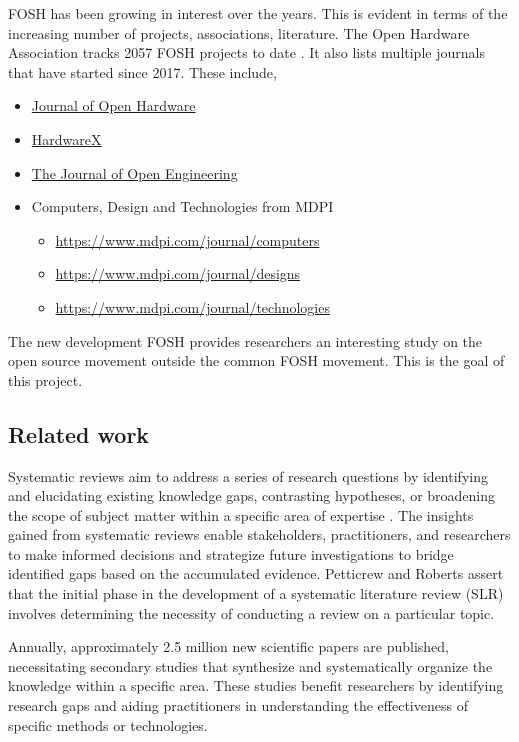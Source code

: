 \documentclass[final-report.tex]{subfiles}
\begin{document}
FOSH has been growing in interest over the years. 
This is evident in terms of the increasing number of projects, associations, literature. 
The Open Hardware Association tracks 
2057 
FOSH projects to date \cite{OSH_association_def}.
It also lists multiple journals that have started since 2017.
These include, 
\begin{itemize}
    \item \href{https://openhardware.metajnl.com/}{Journal of Open Hardware}
    \item \href{https://www.sciencedirect.com/journal/hardwarex}{HardwareX}
    \item \href{https://www.tjoe.org/}{The Journal of Open Engineering}
    \item Computers, Design and Technologies from MDPI
        \begin{itemize}
            \item \href{Computers}{https://www.mdpi.com/journal/computers}
            \item \href{Designs}{https://www.mdpi.com/journal/designs}
            \item \href{Technologies}{https://www.mdpi.com/journal/technologies}
        \end{itemize}
\end{itemize}

The new development FOSH provides researchers an interesting study on the open source movement outside the common FOSH movement. 
This is the goal of this project. 

\subsection{Related work}
Systematic reviews aim to address a series of research questions by identifying and elucidating existing knowledge gaps, contrasting hypotheses, or broadening the scope of subject matter within a specific area of expertise \cite{gough2017introduction}. The insights gained from systematic reviews enable stakeholders, practitioners, and researchers to make informed decisions and strategize future investigations to bridge identified gaps based on the accumulated evidence. Petticrew and Roberts \cite{petticrew2008systematic} assert that the initial phase in the development of a systematic literature review (SLR) involves determining the necessity of conducting a review on a particular topic.

Annually, approximately 2.5 million new scientific papers are published, necessitating secondary studies that synthesize and systematically organize the knowledge within a specific area. These studies benefit researchers by identifying research gaps and aiding practitioners in understanding the effectiveness of specific methods or technologies.
\end{document}
